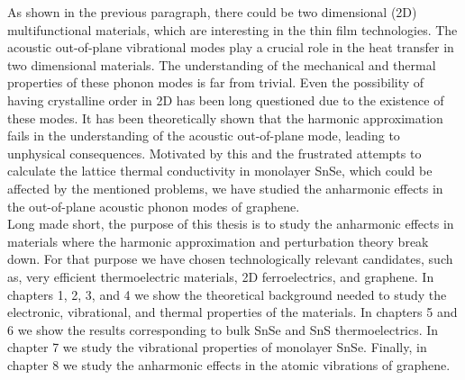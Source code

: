 As shown in the previous paragraph, there could be two dimensional (2D) multifunctional materials, which are 
interesting in the thin film technologies. The acoustic out-of-plane vibrational modes play a crucial
role\cite{lindsay2010flexural} in the heat transfer in two dimensional materials. The understanding of the mechanical 
and thermal properties of these phonon modes is far from trivial. Even the possibility of having crystalline order 
in 2D has been long questioned\cite{landau_statistical_physics,mermin1968crystalline} due to the existence of these 
modes. It has been theoretically shown that the harmonic approximation fails\cite{katsnelson2013graphene} in the 
understanding of the acoustic out-of-plane mode, leading to unphysical consequences. Motivated by this and the 
frustrated attempts to calculate the lattice thermal conductivity in monolayer SnSe, which could be affected by the 
mentioned problems, we have studied the anharmonic effects in the out-of-plane acoustic phonon modes of graphene. \\

Long made short, the purpose of this thesis is to study the anharmonic effects in materials where the harmonic 
approximation and perturbation theory break down. For that purpose we have chosen technologically relevant 
candidates, such as, very efficient thermoelectric materials, 2D ferroelectrics, and graphene. In chapters 1, 2, 3, 
and 4 we show the theoretical background needed to study the electronic, vibrational, and thermal properties of the 
materials. In chapters 5 and 6 we show the results corresponding to bulk SnSe and SnS thermoelectrics. In chapter 7 
we study the vibrational properties of monolayer SnSe. Finally, in chapter 8 we study the anharmonic effects in the 
atomic vibrations of graphene. 

